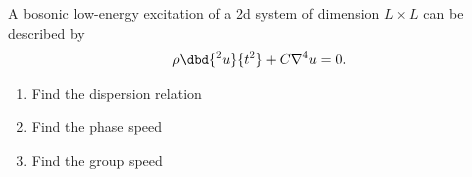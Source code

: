 
     A bosonic low-energy excitation of a 2d system of dimension
        $L\times L$ can be described by
        \begin{align}
            \rho \dbd{^2 u}{t^2} + C\nabla^4 u=0.
        \end{align}
        \begin{enumerate}
            \item {}Find the dispersion relation
            \item {}Find the phase speed
            \item {}Find the group speed
        \end{enumerate}

